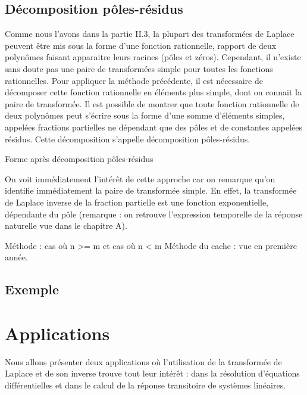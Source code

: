 \documentclass[]{report}
\begin{document}
	\subsection{Décomposition pôles-résidus}
	Comme nous l'avons dans la partie II.3, la plupart des transformées de Laplace peuvent être mis sous la forme d'une fonction rationnelle, rapport de deux polynômes faisant apparaitre leurs racines (pôles et zéros). Cependant, il n'existe sans doute pas une paire de transformées simple pour toutes les fonctions rationnelles. Pour appliquer la méthode précédente, il est nécessaire de décomposer cette fonction rationnelle en éléments plus simple, dont on connait la paire de transformée.
	Il est possible de montrer que toute fonction rationnelle de deux polynômes peut s'écrire sous la forme d'une somme d'éléments simples, appelées fractions partielles ne dépendant que des pôles et de constantes appelées résidus. Cette décomposition s'appelle décomposition pôles-résidus. 
	
	Forme après décomposition pôles-résidus
	
	On voit immédiatement l'intérêt de cette approche car on remarque qu'on identifie immédiatement la paire de transformée simple. En effet, la transformée de Laplace inverse de la fraction partielle est une fonction exponentielle, dépendante du pôle (remarque : on retrouve l'expression temporelle de la réponse naturelle vue dans le chapitre A).
	
	Méthode : cas où n >= m et cas où n < m
	Méthode du cache : vue en première année.
	
	\subsection{Exemple}
	
	\section{Applications} 
	Nous allons présenter deux applications où l'utilisation de la transformée de Laplace et de son inverse trouve tout leur intérêt : dans la résolution d'équations différentielles et dans le calcul de la réponse transitoire de systèmes linéaires.
\end{document}
